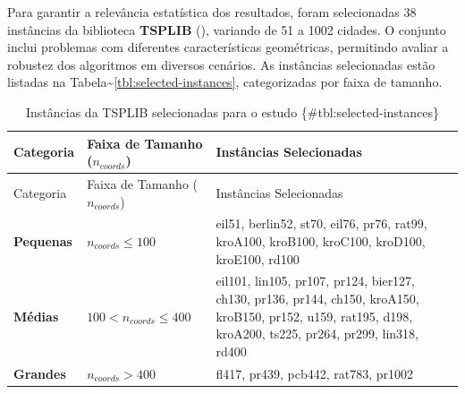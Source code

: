 Para garantir a relevância estatística dos resultados, foram
selecionadas 38 instâncias da biblioteca \textbf{TSPLIB}
(), variando de 51 a 1002 cidades. O
conjunto inclui problemas com diferentes características geométricas,
permitindo avaliar a robustez dos algoritmos em diversos cenários. As
instâncias selecionadas estão listadas na
Tabela\textasciitilde{}\ref{tbl:selected-instances}, categorizadas por
faixa de tamanho.

\begin{longtable}[]{@{}
  >{\raggedright\arraybackslash}p{}
  >{\centering\arraybackslash}p{}
  >{\raggedright\arraybackslash}p{}@{}}
\caption{Instâncias da TSPLIB selecionadas para o estudo
\{\#tbl:selected-instances\}}\tabularnewline
\toprule\noalign{}
\begin{minipage}[b]{\linewidth}\raggedright
Categoria
\end{minipage} & \begin{minipage}[b]{\linewidth}\centering
Faixa de Tamanho (\(n_{coords}\))
\end{minipage} & \begin{minipage}[b]{\linewidth}\raggedright
Instâncias Selecionadas
\end{minipage} \\
\midrule\noalign{}
\endfirsthead
\toprule\noalign{}
\begin{minipage}[b]{\linewidth}\raggedright
Categoria
\end{minipage} & \begin{minipage}[b]{\linewidth}\centering
Faixa de Tamanho (\(n_{coords}\))
\end{minipage} & \begin{minipage}[b]{\linewidth}\raggedright
Instâncias Selecionadas
\end{minipage} \\
\midrule\noalign{}
\endhead
\bottomrule\noalign{}
\endlastfoot
\textbf{Pequenas} & \(n_{coords} \le 100\) & eil51, berlin52, st70,
eil76, pr76, rat99, kroA100, kroB100, kroC100, kroD100, kroE100,
rd100 \\
\textbf{Médias} & \(100 < n_{coords} \le 400\) & eil101, lin105, pr107,
pr124, bier127, ch130, pr136, pr144, ch150, kroA150, kroB150, pr152,
u159, rat195, d198, kroA200, ts225, pr264, pr299, lin318, rd400 \\
\textbf{Grandes} & \(n_{coords} > 400\) & fl417, pr439, pcb442, rat783,
pr1002 \\
\end{longtable}

